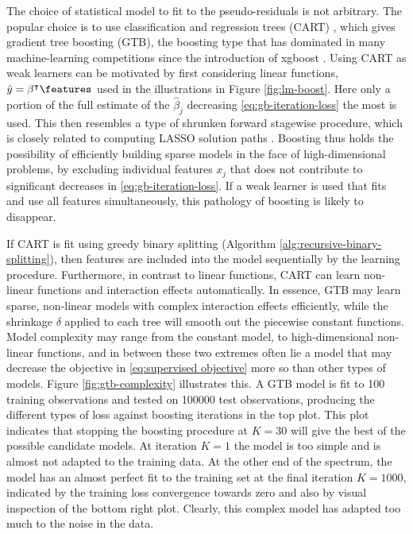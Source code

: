 The choice of statistical model to fit to the pseudo-residuals is not arbitrary.
The popular choice is to use classification and regression trees (CART) \citep{breiman1984classification}, which gives gradient tree boosting (GTB), the boosting type that has dominated in many machine-learning competitions since the introduction of xgboost \citep{chen2016xgboost}.
Using CART as weak learners can be motivated by first considering linear functions, $\hat{y}=\beta^\intercal \features$ used in the illustrations in Figure \ref{fig:lm-boost}.
Here only a portion of the full estimate of the $\hat{\beta}_j$ decreasing \eqref{eq:gb-iteration-loss} the most is used. This then resembles a type of shrunken forward stagewise procedure, which is closely related to computing LASSO solution paths \citep{friedman2001elements}.
Boosting thus holds the possibility of efficiently building sparse models in the face of high-dimensional problems, by excluding individual features $x_j$ that does not contribute to significant decreases in \eqref{eq:gb-iteration-loss}.
If a weak learner is used that fits and use all features simultaneously, this pathology of boosting is likely to disappear.

If CART is fit using greedy binary splitting (Algorithm \ref{alg:recursive-binary-splitting}), then features are included into the model sequentially by the learning procedure.
Furthermore, in contrast to linear functions, CART can learn non-linear functions and interaction effects automatically.
In essence, GTB may learn sparse, non-linear models with complex interaction effects efficiently, while the shrinkage $\delta$ applied to each tree will smooth out the piecewise constant functions.
Model complexity may range from the constant model, to high-dimensional non-linear functions, and in between these two extremes often lie a model that may decrease the objective in \eqref{eq:supervised objective} more so than other types of models.
Figure \ref{fig:gtb-complexity} illustrates this. 
A GTB model is fit to 100 training observations and tested on 100000 test observations, producing the different types of loss against boosting iterations in the top plot.
This plot indicates that stopping the boosting procedure at $K=30$ will give the best of the 
possible candidate models. At iteration $K=1$ the model is too simple and
is almost not adapted to the training data. At the other end of the spectrum, the model
has an almost perfect fit to the training set at the final iteration $K=1000$, indicated by the training loss convergence towards zero and also by visual inspection of the bottom right plot.
Clearly, this complex model has adapted too much to the noise in the data.

